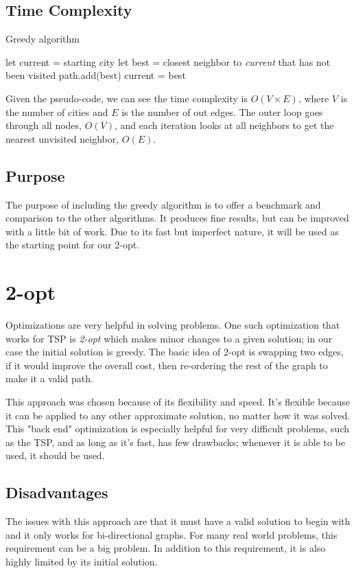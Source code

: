 \documentclass[12pt]{report}
\begin{document}
\newpage
\subsection{Time Complexity}
\begin{algorithm}
\caption{Greedy algorithm}
\label{Greedy_Alg}
\begin{algorithmic}[1]
    \State let current = starting city
    \State let best = closest neighbor to \textit{current} that has not been visited
    \State path.add(best)
    \State current = best
    \EndWhile
\EndProcedure
\end{algorithmic}
\end{algorithm}

\begin{multicols}{2}
    Given the pseudo-code, we can see the time complexity is $O(V \times E)$, where $V$ is the number of cities and $E$ is the number of out edges. The outer loop goes through all nodes, $O(V)$, and each iteration looks at all neighbors to get the nearest unvisited neighbor, $O(E)$.
    \subsection{Purpose}
    The purpose of including the greedy algorithm is to offer a benchmark and comparison to the other algorithms. It produces fine results, but can be improved with a little bit of work. Due to its fast but imperfect nature, it will be used as the starting point for our 2-opt.

    \section{2-opt}
    Optimizations are very helpful in solving problems. One such optimization that works for TSP is \textit{2-opt} which makes minor changes to a given solution; in our case the initial solution is greedy. The basic idea of 2-opt is swapping two edges, if it would improve the overall cost, then re-ordering the rest of the graph to make it a valid path.

    This approach was chosen because of its flexibility and speed. It's flexible because it can be applied to any other approximate solution, no matter how it was solved. This "back end" optimization is especially helpful for very difficult problems, such as the TSP, and as long as it's fast, has few drawbacks; whenever it is able to be used, it should be used.
    \subsection{Disadvantages}
    The issues with this approach are that it must have a valid solution to begin with and it only works for bi-directional graphs. For many real world problems, this requirement can be a big problem. In addition to this requirement, it is also highly limited by its initial solution.

\end{multicols}
\end{document}
